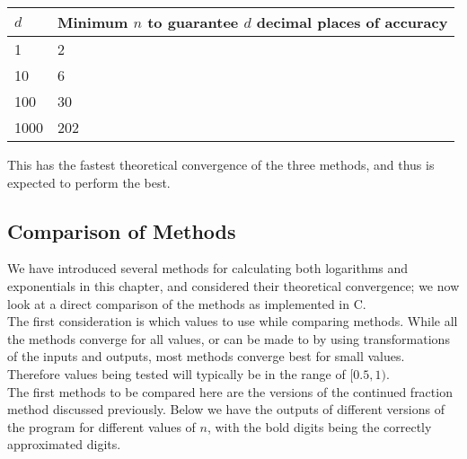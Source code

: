 \begin{center}
\begin{tabular}{|l|l|}
\hline
\(d\) & Minimum \(n\) to guarantee \(d\) decimal places of accuracy\\\hline
1 & 2 \\\hline
10 & 6 \\\hline
100 & 30 \\\hline
1000 & 202 \\\hline
\end{tabular}
\end{center}

This has the fastest theoretical convergence of the three methods, and thus is expected to perform the best.

\subsection{Comparison of Methods}

We have introduced several methods for calculating both logarithms and exponentials in this chapter, and considered their theoretical convergence; we now look at a direct comparison of the methods as implemented in C.\\

The first consideration is which values to use while comparing methods. While all the methods converge for all values, or can be made to by using transformations of the inputs and outputs, most methods converge best for small values. Therefore values being tested will typically be in the range of \([0.5, 1)\).\\

The first methods to be compared here are the versions of the continued fraction method discussed previously. Below we have the outputs of different versions of the program for different values of \(n\), with the bold digits being the correctly approximated digits.


